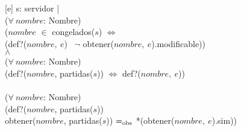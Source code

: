 \begin{Representacion}
    [e]{
        s: servidor | \\
            \tab ($\forall\ nombre$: Nombre)\\
                \tab\tab ($nombre$ $\in$ congelados($s$) $\Leftrightarrow$ \\
                \tab\tab (def?($nombre,\ e$) \yluego\ $\neg$ obtener($nombre,\ e$).modificable)) \\
            \tab $\wedge$ \\
            \tab ($\forall\ nombre$: Nombre)\\
                \tab\tab (def?($nombre$, partidas($s$)) $\Leftrightarrow$ def?($nombre,\ e$)) \\
            \tab \yluego \\
            \tab ($\forall\ nombre$: Nombre)\\
                \tab\tab (def?($nombre$, partidas($s$)) \impluego \\ 
                \tab\tab obtener($nombre$, partidas($s$)) $=_{\mathrm{obs}}$ *(obtener($nombre,\ e$).sim)) \\
    }  

  \end{Representacion}
  
